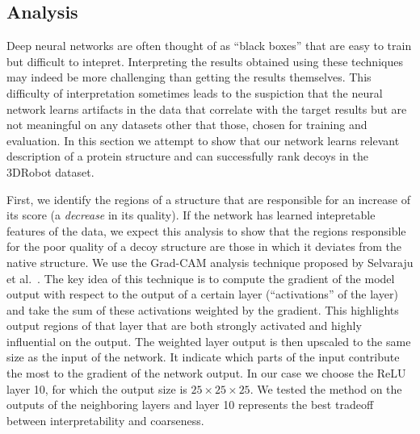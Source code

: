 \documentclass{bioinfo}
\begin{document}
\subsection{Analysis}
Deep neural networks are often thought of as ``black boxes'' that are
easy to train but difficult to intepret. Interpreting the results
obtained using these techniques may indeed be more challenging than
getting the results themselves. This difficulty of interpretation
sometimes leads to the suspiction that the neural network learns
artifacts in the data that correlate with the target results but are
not meaningful on any datasets other that those, chosen for training and evaluation.
%
In this section we attempt to show that our network learns relevant
description of a protein structure and can successfully rank decoys in the 3DRobot dataset.

First, we identify the regions of a structure that are responsible for
an increase of its score (a \emph{decrease} in its quality). If the
network has learned intepretable features of the data, we expect this
analysis to show that the regions responsible for the poor quality of
a decoy structure are those in which it deviates from the native
structure.
%
We use the Grad-CAM analysis technique proposed by Selvaraju et
al.~\citep{selvaraju2016grad}. The key idea of this technique is to
compute the gradient of the model output with respect to the output of a certain layer (``activations'' of the layer) 
and take the sum of these activations weighted by the gradient.
This highlights output regions of that layer that are both strongly
activated and highly influential on the output.
The weighted layer output is then upscaled to the same size as the input of the network. 
It indicate which parts of the input contribute the most to the gradient of the network output.
In our case we choose the ReLU layer 10, for which
the output size is $25\times 25\times 25$.
We tested the method on the outputs of the neighboring layers and
layer 10 represents the best tradeoff between interpretability and
coarseness.
\end{document}
